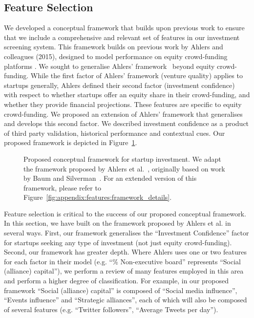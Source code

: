 \documentclass[../thesis/thesis.tex]{subfiles}
\begin{document}
\subsection{Feature Selection}

We developed a conceptual framework that builds upon previous work to ensure that we include a comprehensive and relevant set of features in our investment screening system. This framework builds on previous work by Ahlers and colleagues (2015), designed to model performance on equity crowd-funding platforms \cite{ahlers2015}. We sought to generalise Ahlers' framework~\cite{ahlers2015} beyond equity crowd-funding. While the first factor of Ahlers' framework (venture quality) applies to startups generally, Ahlers defined their second factor (investment confidence) with respect to whether startups offer an equity share in their crowd-funding, and whether they provide financial projections. These features are specific to equity crowd-funding. We proposed an extension of Ahlers' framework that generalises and develops this second factor. We described investment confidence as a product of third party validation, historical performance and contextual cues. Our proposed framework is depicted in Figure~\ref{fig:design:features:framework_simple}.

\begin{figure}[!htb]
    \centering
    
    \caption[Conceptual framework for startup investment.]{Proposed conceptual framework for startup investment. We adapt the framework proposed by Ahlers et al.~\cite{ahlers2015}, originally based on work by Baum and Silverman~\cite{baum2004}. For an extended version of this framework, please refer to Figure~\ref{fig:appendix:features:framework_details}.}
    \label{fig:design:features:framework_simple}
\end{figure}

Feature selection is critical to the success of our proposed conceptual framework. In this section, we have built on the framework proposed by Ahlers et al. \cite{ahlers2015} in several ways. First, our framework generalises the ``Investment Confidence'' factor for startups seeking any type of investment (not just equity crowd-funding). Second, our framework has greater depth. Where Ahlers uses one or two features for each factor in their model (e.g. ``\% Non-executive board'' represents ``Social (alliance) capital''), we perform a review of many features employed in this area and perform a higher degree of classification. For example, in our proposed framework ``Social (alliance) capital'' is composed of ``Social media influence'', ``Events influence'' and ``Strategic alliances'', each of which will also be composed of several features (e.g. ``Twitter followers'', ``Average Tweets per day'').
\end{document}
